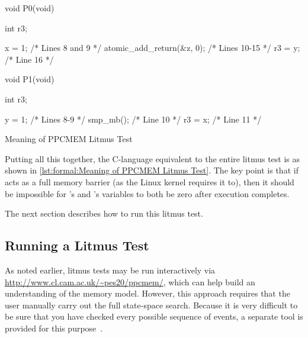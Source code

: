 \QuickQuizEnd

\begin{listing}[tbp]
\begin{VerbatimL}
void P0(void)
{
	int r3;

	x = 1; /* Lines 8 and 9 */
	atomic_add_return(&z, 0); /* Lines 10-15 */
	r3 = y; /* Line 16 */
}

void P1(void)
{
	int r3;

	y = 1; /* Lines 8-9 */
	smp_mb(); /* Line 10 */
	r3 = x; /* Line 11 */
}
\end{VerbatimL}
\caption{Meaning of PPCMEM Litmus Test}
\label{lst:formal:Meaning of PPCMEM Litmus Test}
\end{listing}

Putting all this together, the C-language equivalent to the entire litmus
test is as shown in
\cref{lst:formal:Meaning of PPCMEM Litmus Test}.
The key point is that if  acts as a full
memory barrier (as the Linux kernel requires it to), 
then it should be impossible for 's and 's 
variables to both be zero after execution completes.

The next section describes how to run this litmus test.

\subsection{Running a Litmus Test}
\label{sec:formal:Running a Litmus Test}

As noted earlier, litmus tests may be run interactively via
\url{http://www.cl.cam.ac.uk/~pes20/ppcmem/}, which can help build an
understanding of the memory model.
However, this approach requires that the user manually carry out the
full state-space search.
Because it is very difficult to be sure that you have checked every
possible sequence of events, a separate tool is provided for this
purpose~\cite{PaulEMcKenney2011ppcmem}.

